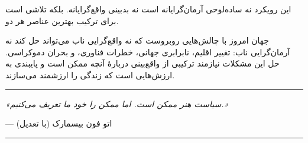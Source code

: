این رویکرد نه ساده‌لوحی آرمان‌گرایانه است نه بدبینی واقع‌گرایانه. بلکه تلاشی است برای ترکیب بهترین عناصر هر دو.

جهان امروز با چالش‌هایی روبروست که نه واقع‌گرایی ناب می‌تواند حل کند نه آرمان‌گرایی ناب: تغییر اقلیم، نابرابری جهانی، خطرات فناوری، و بحران دموکراسی. حل این مشکلات نیازمند ترکیبی از واقع‌بینی دربارهٔ آنچه ممکن است و پایبندی به ارزش‌هایی است که زندگی را ارزشمند می‌سازند.


\vspace{10mm}
\begin{center}
\rule{0.6\textwidth}{1pt}

\vspace{3mm}
\textit{«سیاست هنر ممکن است. اما ممکن را خود ما تعریف می‌کنیم.»}

\vspace{2mm}
--- اتو فون بیسمارک (با تعدیل)

\vspace{3mm}
\rule{0.6\textwidth}{1pt}
\end{center}
